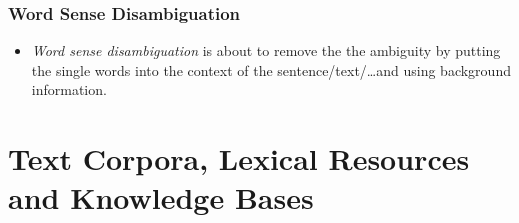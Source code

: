 \documentclass[a4paper, 11pt, accentcolor = tud3b]{tudreport}
\begin{document}
            \subsection{Word Sense Disambiguation} %
                \begin{itemize}
                	\item \textit{Word sense disambiguation} is about to remove the the ambiguity by putting the single words into the context of the sentence/text/\dots and using background information.
                \end{itemize}

    \chapter{Text Corpora, Lexical Resources and Knowledge Bases} %
    	\label{c:corpora}
\end{document}
